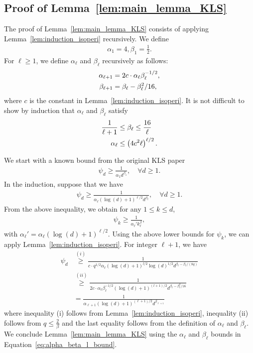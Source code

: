 \documentclass[11pt,twoside]{article}
\newcommand{\isoperi}{\psi}
\theoremstyle{named}
\theoremstyle{plain}
\newcommand{\usedim}{\ensuremath{d}}
\newcommand{\dims}{\usedim}
\newcommand{\parenth}[1]{\left( #1 \right)}
\begin{document}
\subsection{Proof of Lemma~\ref{lem:main_lemma_KLS}} %
\label{sub:proof_of_lemma_lem:main_lemma_kls}
The proof of Lemma~\ref{lem:main_lemma_KLS} consists of applying Lemma~\ref{lem:induction_isoperi} recursively. We define
\begin{align*}
  \alpha_1 = 4, \beta_1 = \frac{1}{2}.
\end{align*}
For $\ell \geq 1$, we define $\alpha_\ell$ and $\beta_\ell$ recursively as follows:
\begin{align}
  \label{eq:alpha_beta_l_recursion}
  \alpha_{\ell+1} &= 2c \cdot \alpha_\ell \beta_\ell^{-1/2},  \notag \\
  \beta_{\ell+1} &= \beta_\ell - \beta_\ell^2/16,
\end{align}
where $c$ is the constant in Lemma~\ref{lem:induction_isoperi}.
It is not difficult to show by induction that $\alpha_\ell$ and $\beta_\ell$ satisfy
\begin{align}
  \label{eq:alpha_beta_l_bound}
  \frac{1}{\ell+1} &\leq \beta_\ell \leq \frac{16}{\ell} \notag \\
  \alpha_\ell &\leq \parenth{4c^2 \ell}^{\ell/2}.
\end{align}

We start with a known bound from the original KLS paper~\cite{kannan1995isoperimetric}
\begin{align*}
  \isoperi_\dims \geq \frac{1}{\alpha_1 \dims^{\beta_1}},\quad \forall \dims \geq 1.
\end{align*}
In the induction, suppose that we have
\begin{align*}
  \isoperi_\dims \geq \frac{1}{\alpha_\ell \parenth{\log(\dims)+1}^{\ell/2} \dims^{\beta_\ell}},\quad \forall \dims \geq 1.
\end{align*}
From the above inequality, we obtain for any $1 \leq k \leq \dims$,
\begin{align*}
  \isoperi_k \geq \frac{1}{\alpha_\ell' k^\beta_\ell},
\end{align*}
with $\alpha_\ell' = \alpha_\ell \parenth{\log(\dims) +1}^{\ell/2}$. Using the above lower bounds for $\isoperi_k$, we can apply Lemma~\ref{lem:induction_isoperi}. For integer $\ell+1$, we have
\begin{align*}
  \isoperi_\dims &\stackrel{(i)}{\geq} \frac{1}{c \cdot q^{1/2} \alpha_\ell \parenth{\log(\dims)+1}^{l/2} \log(\dims)^{1/2} \dims^{\beta_\ell - \beta_\ell / (8q) }}\\
  &\stackrel{(ii)}{\geq} \frac{1}{2c \cdot \alpha_\ell \beta_\ell^{-1/2}  \parenth{\log(\dims)+1}^{(l+1)/2} \dims^{\beta_\ell - \beta_\ell^2 / 16 }} \\
  &= \frac{1}{\alpha_{\ell+1} \parenth{\log(\dims)+1}^{(\ell+1)/2} \dims^{\beta_{\ell+1}}}
\end{align*}
where inequality (i) follows from Lemma~\ref{lem:induction_isoperi}, inequality (ii) follows from $q \leq \frac{2}{\beta}$ and the last equality follows from the definition of $\alpha_\ell$ and $\beta_\ell$. We conclude Lemma~\ref{lem:main_lemma_KLS} using the $\alpha_\ell$ and $\beta_\ell$ bounds in Equation~\eqref{eq:alpha_beta_l_bound}.
\end{document}
